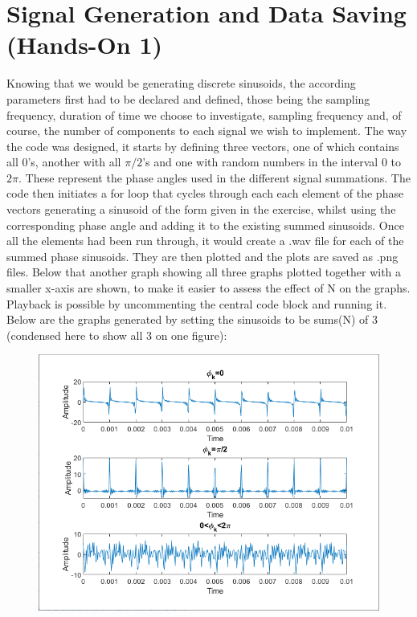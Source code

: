 \documentclass[journal]{IEEEtran}
\begin{document}
\section{Signal Generation and Data Saving (Hands-On 1)}
Knowing that we would be generating discrete sinusoids, the according parameters first had to be declared and defined, those being the sampling frequency, duration of time we choose to investigate, sampling frequency and, of course, the number of components to each signal we wish to implement. The way the code was designed, it starts by defining three vectors, one of which contains all 0's, another with all $\pi/2$'s and one with random numbers in the interval 0 to $2\pi$. These represent the phase angles used in the different signal summations. The code then initiates a for loop that cycles through each each element of the phase vectors generating a sinusoid of the form given in the exercise, whilst using the corresponding phase angle and adding it to the existing summed sinusoids. Once all the elements had been run through, it would create a .wav file for each of the summed phase sinusoids. They are then plotted and the plots are saved as .png files. Below that another graph showing all three graphs plotted together with a smaller x-axis are shown, to make it easier to assess the effect of N on the graphs. Playback is possible by uncommenting the central code block and running it. Below are the graphs generated by setting the sinusoids to be sums(N) of 3 (condensed here to show all 3 on one figure):
\newline
\begin{figure}[H]
    \centering
    \includegraphics[width=\linewidth]{assignment_01/plots/PHs.png}
    \label{fig:zeroph}
\end{figure}
\end{document}
